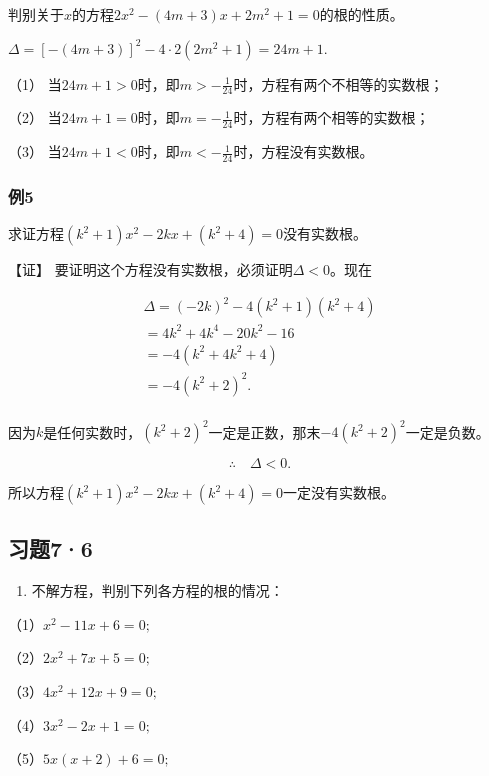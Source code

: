 判别关于\(x\)的方程\(2x^{2} - (4m + 3)x + 2m^{2} + 1 = 0\)的根的性质。

\(\Delta = [-(4m + 3)]^2 - 4 \cdot 2(2m^2 + 1) = 24m + 1.\)

（1）
当\(24m + 1 > 0\)时，即\(m > -\frac{1}{24}\)时，方程有两个不相等的实数根；

（2）
当\(24m + 1 = 0\)时，即\(m = -\frac{1}{24}\)时，方程有两个相等的实数根；

（3） 当\(24m + 1 < 0\)时，即\(m < -\frac{1}{24}\)时，方程没有实数根。

\subsubsection{例5}

求证方程\((k^2 + 1)x^2 - 2kx + (k^2 + 4) = 0\)没有实数根。

【证】 要证明这个方程没有实数根，必须证明\(\Delta < 0\)。现在

\[
\begin{array}{l} \Delta = (- 2 k) ^ {2} - 4 (k ^ {2} + 1) (k ^ {2} + 4) \\ = 4 k ^ {2} + 4 k ^ {4} - 20 k ^ {2} - 16 \\ = - 4 (k ^ {2} + 4 k ^ {2} + 4) \\ = - 4 (k ^ {2} + 2) ^ {2}. \\ \end{array}
\]

因为\(k\)是任何实数时，\((k^2 + 2)^2\)一定是正数，那末\(-4(k^2 + 2)^2\)一定是负数。

\[
\therefore \quad \Delta <   0.
\]

所以方程\((k^2 + 1)x^2 - 2kx + (k^2 + 4) = 0\)一定没有实数根。

\subsection{习题7·6}

\begin{enumerate}
\item
  不解方程，判别下列各方程的根的情况：
\end{enumerate}

（1）\(x^{2} - 11x + 6 = 0;\)

（2）\(2x^{2} + 7x + 5 = 0;\)

（3）\(4x^{2} + 12x + 9 = 0;\)

（4）\(3x^{2} - 2x + 1 = 0;\)

（5）\(5x(x + 2) + 6 = 0;\)

